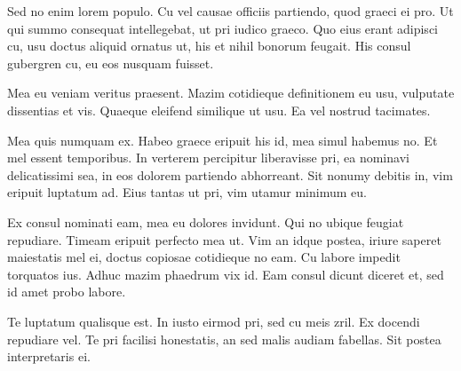\documentclass{article}
\begin{document}
Sed no enim lorem populo. Cu vel causae officiis partiendo, quod graeci ei pro. Ut qui summo consequat intellegebat, ut pri iudico graeco. Quo eius erant adipisci cu, usu doctus aliquid ornatus ut, his et nihil bonorum feugait. His consul gubergren cu, eu eos nusquam fuisset.

Mea eu veniam veritus praesent. Mazim cotidieque definitionem eu usu, vulputate dissentias et vis. Quaeque eleifend similique ut usu. Ea vel nostrud tacimates.

Mea quis numquam ex. Habeo graece eripuit his id, mea simul habemus no. Et mel essent temporibus. In verterem percipitur liberavisse pri, ea nominavi delicatissimi sea, in eos dolorem partiendo abhorreant. Sit nonumy debitis in, vim eripuit luptatum ad. Eius tantas ut pri, vim utamur minimum eu.

Ex consul nominati eam, mea eu dolores invidunt. Qui no ubique feugiat repudiare. Timeam eripuit perfecto mea ut. Vim an idque postea, iriure saperet maiestatis mel ei, doctus copiosae cotidieque no eam. Cu labore impedit torquatos ius. Adhuc mazim phaedrum vix id. Eam consul dicunt diceret et, sed id amet probo labore.

Te luptatum qualisque est. In iusto eirmod pri, sed cu meis zril. Ex docendi repudiare vel. Te pri facilisi honestatis, an sed malis audiam fabellas. Sit postea interpretaris ei.
\end{document}
